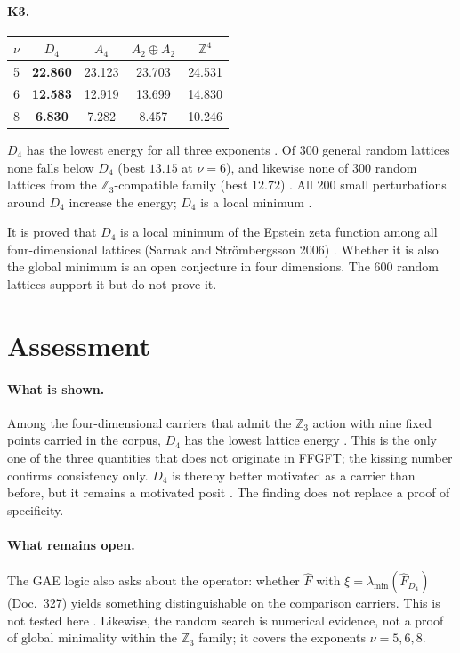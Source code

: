 \paragraph{K3.}
\begin{center}
\begin{tabular}{lcccc}
\toprule
$\nu$ & $D_4$ & $A_4$ & $A_2\oplus A_2$ & $\mathbb{Z}^4$ \\
\midrule
5 & \textbf{22.860} & 23.123 & 23.703 & 24.531 \\
6 & \textbf{12.583} & 12.919 & 13.699 & 14.830 \\
8 & \textbf{6.830} & 7.282 & 8.457 & 10.246 \\
\bottomrule
\end{tabular}
\end{center}
$D_4$ has the lowest energy for all three exponents \KM. Of 300 general random
lattices none falls below $D_4$ (best $13.15$ at $\nu=6$), and likewise none of
300 random lattices from the $\mathbb{Z}_3$-compatible family (best $12.72$)
\KM. All 200 small perturbations around $D_4$ increase the energy; $D_4$ is a
local minimum \KM.

It is proved that $D_4$ is a local minimum of the Epstein zeta function among
all four-dimensional lattices (Sarnak and Strömbergsson 2006) \QM. Whether it
is also the global minimum is an open conjecture in four dimensions. The 600
random lattices support it but do not prove it.

\section{Assessment}

\paragraph{What is shown.}
Among the four-dimensional carriers that admit the $\mathbb{Z}_3$ action with
nine fixed points carried in the corpus, $D_4$ has the lowest lattice energy
\KM. This is the only one of the three quantities that does not originate in
FFGFT; the kissing number confirms consistency only. $D_4$ is thereby better
motivated as a carrier than before, but it remains a motivated posit
\SetzM. The finding does not replace a proof of specificity.

\paragraph{What remains open.}
The GAE logic also asks about the operator: whether $\hat F$ with
$\xi=\lambda_{\min}(\hat F_{D_4})$ (Doc.~327) yields something distinguishable on
the comparison carriers. This is not tested here \SM. Likewise, the random
search is numerical evidence, not a proof of global minimality within the
$\mathbb{Z}_3$ family; it covers the exponents $\nu=5,6,8$.

